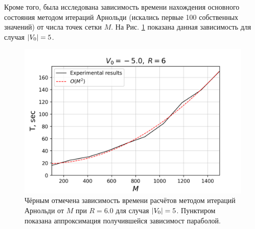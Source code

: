 \documentclass[10pt]{article}
\begin{document}
Кроме того, была исследована зависимость времени нахождения основного состояния методом итераций Арнольди (искались первые 100 собственных значений) от числа точек сетки $M$. На Рис. \ref{fig:T_vs_M_-5.0_l0} показана данная зависимость для случая $\abs{V_0}=5$.
\begin{figure}
 \centering
 \includegraphics[width=\textwidth]{../figures/T_vs_M_-5.0_l5}
 \caption{Чёрным отмечена зависимость времени расчётов методом итераций Арнольди от $M$ при $R=6.0$ для случая $\abs{V_0}=5$. Пунктиром показана аппроксимация получившейся зависимост параболой.}
 \label{fig:T_vs_M_-5.0_l0}
\end{figure}
\end{document}
